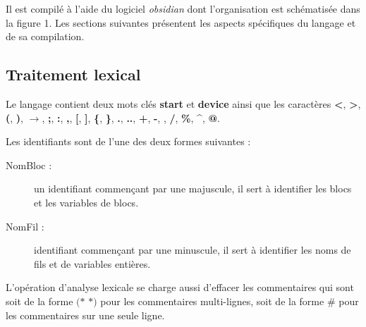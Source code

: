 \documentclass[13pt]{article}
\begin{document}
Il est compilé à l'aide du logiciel \emph{obsidian} dont l'organisation est
schématisée dans la figure 1. Les sections suivantes présentent les aspects spécifiques du langage et de sa compilation.

\subsection{Traitement lexical}
Le langage contient deux mots clés {\bf start} et {\bf device } ainsi que les
caractères {\bf <}, {\bf >}, {\bf (}, {\bf )}, {\bf $\to$}, {\bf ;}, {\bf :}, {\bf ,},
{\bf [}, {\bf ]}, {\bf \{}, {\bf \}}, {\bf .}, {\bf ..}, {\bf +}, {\bf -}, {\bf *}, {\bf /},
{\bf \%}, {\bf \^{}}, {\bf @}. 

Les identifiants sont de l'une des deux formes suivantes :
\begin{description}
\item[NomBloc : ] un identifiant commençant par une majuscule, il sert à
  identifier les blocs et les variables de blocs.
\item[NomFil : ] identifiant commençant par une minuscule, il sert à identifier
  les noms de fils et de variables entières.
\end{description}

L'opération d'analyse lexicale se charge aussi d'effacer les commentaires qui
sont soit de la forme \og $(*$\fg{} \og $*)$\fg{} pour les commentaires
multi-lignes, soit de la forme \og \#\fg{} pour les commentaires sur une seule ligne.
\end{document}
